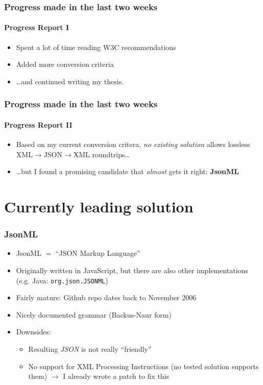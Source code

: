 \documentclass[
    alternativetitlepage=alternativ,
    cornerlogo=hgi_nds_logo2,
    sectionoverview,
]{rubpresentation}
\begin{document}
\begin{frame}
    \frametitle{Progress made in the last two weeks}
    \framesubtitle{Progress Report I}
    \begin{itemize}
        \item{} Spent a lot of time reading W3C recommendations
        \item{} Added more conversion criteria
        \item{} \dots{}and continued writing my thesis.
    \end{itemize}
\end{frame}

\begin{frame}
    \frametitle{Progress made in the last two weeks}
    \framesubtitle{Progress Report II}
    \begin{itemize}
        \item{} Based on my current conversion critera, \emph{no existing solution} allows lossless XML$\rightarrow$JSON$\rightarrow$XML roundtrips\dots{}
        \item<2->{} \dots{}but I found a promising candidate that \emph{almost} gets it right: \textbf{JsonML}
    \end{itemize}
\end{frame}

\section{Currently leading solution}

\begin{frame}[fragile]
    \frametitle{JsonML}
    \begin{itemize}
        \item{} JsonML $=$ \enquote{JSON Markup Language}
        \item{} Originally written in JavaScript, but there are also other implementations (e.g. Java: \texttt{org.json.JSONML})
        \item{} Fairly mature: Github repo dates back to November 2006
        \item{} Nicely documented grammar (Backus-Naur form)
        \item{} Downsides:
            \begin{itemize}
                \item{} Resulting \emph{JSON} is not really \enquote{friendly}
                \item{} No support for XML Processing Instructions (no tested solution supports them) $\rightarrow$ I already wrote a patch to fix this
            \end{itemize}
    \end{itemize}
\end{frame}
\end{document}
